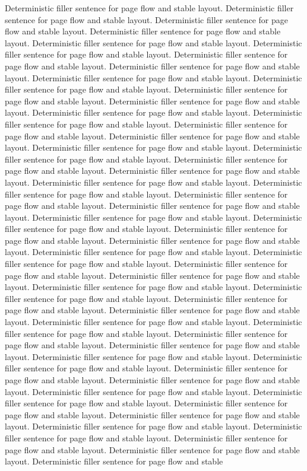 \documentclass{article}
\begin{document}
Deterministic filler sentence for page flow and stable layout. Deterministic filler sentence for page flow and stable layout. Deterministic filler sentence for page flow and stable layout. Deterministic filler sentence for page flow and stable layout. Deterministic filler sentence for page flow and stable layout. Deterministic filler sentence for page flow and stable layout. Deterministic filler sentence for page flow and stable layout. Deterministic filler sentence for page flow and stable layout. Deterministic filler sentence for page flow and stable layout. Deterministic filler sentence for page flow and stable layout. Deterministic filler sentence for page flow and stable layout. Deterministic filler sentence for page flow and stable layout. Deterministic filler sentence for page flow and stable layout. Deterministic filler sentence for page flow and stable layout. Deterministic filler sentence for page flow and stable layout. Deterministic filler sentence for page flow and stable layout. Deterministic filler sentence for page flow and stable layout. Deterministic filler sentence for page flow and stable layout. Deterministic filler sentence for page flow and stable layout. Deterministic filler sentence for page flow and stable layout. Deterministic filler sentence for page flow and stable layout. Deterministic filler sentence for page flow and stable layout. Deterministic filler sentence for page flow and stable layout. Deterministic filler sentence for page flow and stable layout. Deterministic filler sentence for page flow and stable layout. Deterministic filler sentence for page flow and stable layout. Deterministic filler sentence for page flow and stable layout. Deterministic filler sentence for page flow and stable layout. Deterministic filler sentence for page flow and stable layout. Deterministic filler sentence for page flow and stable layout. Deterministic filler sentence for page flow and stable layout. Deterministic filler sentence for page flow and stable layout. Deterministic filler sentence for page flow and stable layout. Deterministic filler sentence for page flow and stable layout. Deterministic filler sentence for page flow and stable layout. Deterministic filler sentence for page flow and stable layout. Deterministic filler sentence for page flow and stable layout. Deterministic filler sentence for page flow and stable layout. Deterministic filler sentence for page flow and stable layout. Deterministic filler sentence for page flow and stable layout. Deterministic filler sentence for page flow and stable layout. Deterministic filler sentence for page flow and stable layout. Deterministic filler sentence for page flow and stable layout. Deterministic filler sentence for page flow and stable layout. Deterministic filler sentence for page flow and stable layout. Deterministic filler sentence for page flow and stable layout. Deterministic filler sentence for page flow and stable layout. Deterministic filler sentence for page flow and stable layout. Deterministic filler sentence for page flow and stable layout. Deterministic filler sentence for page flow and stable layout. Deterministic filler sentence for page flow and stable layout. Deterministic filler sentence for page flow and stable layout. Deterministic filler sentence for page flow and stable 
\end{document}
